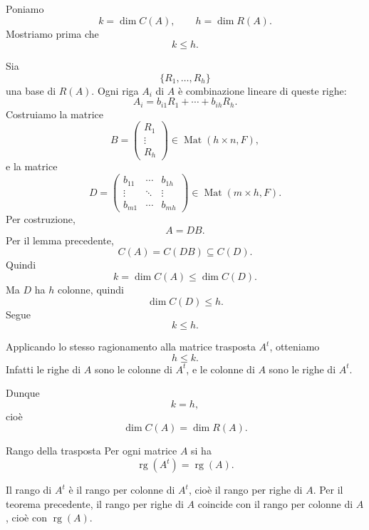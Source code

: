 \documentclass[a4paper]{article}
\begin{document}
\begin{snippetproof}{}
    Poniamo
    \[
        k=\dim C(A),
        \qquad
        h=\dim R(A).
    \]
    Mostriamo prima che
    \[
        k\leq h.
    \]

    Sia
    \[
        \{R_1,\ldots,R_h\}
    \]
    una base di \(R(A)\). Ogni riga \(A_i\) di \(A\) è combinazione lineare di queste righe:
    \[
        A_i=b_{i1}R_1+\cdots+b_{ih}R_h.
    \]
    Costruiamo la matrice
    \[
        B=
        \begin{pmatrix}
            R_1\\
            \vdots\\
            R_h
        \end{pmatrix}
        \in\operatorname{Mat}(h\times n,F),
    \]
    e la matrice
    \[
        D=
        \begin{pmatrix}
            b_{11} & \cdots & b_{1h}\\
            \vdots & \ddots & \vdots\\
            b_{m1} & \cdots & b_{mh}
        \end{pmatrix}
        \in\operatorname{Mat}(m\times h,F).
    \]
    Per costruzione,
    \[
        A=DB.
    \]
    Per il lemma precedente,
    \[
        C(A)=C(DB)\subseteq C(D).
    \]
    Quindi
    \[
        k=\dim C(A)\leq \dim C(D).
    \]
    Ma \(D\) ha \(h\) colonne, quindi
    \[
        \dim C(D)\leq h.
    \]
    Segue
    \[
        k\leq h.
    \]

    Applicando lo stesso ragionamento alla matrice trasposta \(A^t\), otteniamo
    \[
        h\leq k.
    \]
    Infatti le righe di \(A\) sono le colonne di \(A^t\), e le colonne di \(A\) sono le righe di \(A^t\).

    Dunque
    \[
        k=h,
    \]
    cioè
    \[
        \dim C(A)=\dim R(A).
    \]
\end{snippetproof}

\begin{snippetcorollary}{Rango della trasposta}
    Per ogni matrice \(A\) si ha
    \[
        \operatorname{rg}(A^t)=\operatorname{rg}(A).
    \]
\end{snippetcorollary}

\begin{snippetproof}{}
    Il rango di \(A^t\) è il rango per colonne di \(A^t\), cioè il rango per righe di \(A\). Per il teorema precedente, il rango per righe di \(A\) coincide con il rango per colonne di \(A\), cioè con \(\operatorname{rg}(A)\).
\end{snippetproof}
\end{document}
